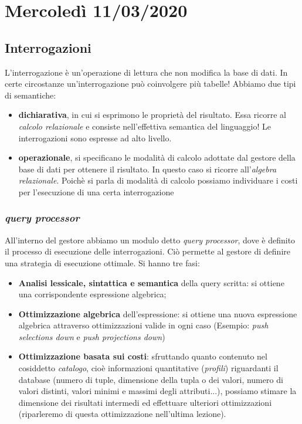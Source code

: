 \chapter{Mercoledì 11/03/2020}
\section{Interrogazioni}
L'interrogazione è un'operazione di lettura che non modifica la base di dati. In certe circostanze un'interrogazione può coinvolgere più tabelle! Abbiamo due tipi di semantiche:
\begin{itemize}
	\item \textbf{dichiarativa}, in cui si esprimono le proprietà del risultato. Essa ricorre al \emph{calcolo relazionale} e consiste nell'effettiva semantica del linguaggio! Le interrogazioni sono espresse ad alto livello.
	\item \textbf{operazionale}, si specificano le modalità di calcolo adottate dal gestore della base di dati per ottenere il risultato. In questo caso si ricorre all'\emph{algebra relazionale}. Poichè si parla di modalità di calcolo possiamo individuare i costi per l'esecuzione di una certa interrogazione
\end{itemize}
\subsection{\emph{query processor}} All'interno del gestore abbiamo un modulo detto \emph{query processor}, dove è definito il processo di esecuzione delle interrogazioni. Ciò permette al gestore di definire una strategia di esecuzione ottimale. Si hanno tre fasi:
\begin{itemize}
	\item \textbf{Analisi lessicale, sintattica e semantica} della query scritta: si ottiene una corrispondente espressione algebrica;
	\item \textbf{Ottimizzazione algebrica} dell'espressione: si ottiene una nuova espressione algebrica attraverso ottimizzazioni valide in ogni caso (Esempio: \emph{push selections down} e \emph{push projections down})
	\item \textbf{Ottimizzazione basata sui costi}: sfruttando quanto contenuto nel cosiddetto \emph{catalogo}, cioè informazioni quantitative (\emph{profili}) riguardanti il database (numero di tuple, dimensione della tupla o dei valori, numero di valori distinti, valori minimi e massimi degli attributi...), possiamo stimare la dimensione dei risultati intermedi ed effettuare ulteriori ottimizzazioni (riparleremo di questa ottimizzazione nell'ultima lezione).
\end{itemize}

